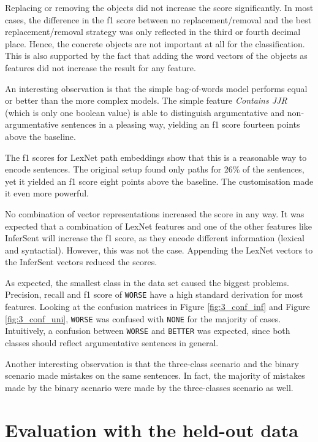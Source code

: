 Replacing or removing the objects did not increase the score significantly. In most cases, the difference in the f1 score between no replacement/removal and the best replacement/removal strategy was only reflected in the third or fourth decimal place. Hence, the concrete objects are not important at all for the classification. This is also supported by the fact that adding the word vectors of the objects as features did not increase the result for any feature.

An interesting observation is that the simple bag-of-words model performs equal or better than the more complex models. The simple feature \emph{Contains JJR} (which is only one boolean value) is able to distinguish argumentative and non-argumentative sentences in a pleasing way, yielding an f1 score fourteen points above the baseline.

The f1 scores for LexNet path embeddings show that this is a reasonable way to encode sentences. The original setup found only paths for 26\% of the sentences, yet it yielded an f1 score eight points above the baseline. The customisation made it even more powerful.

No combination of vector representations increased the score in any way. It was expected that a combination of LexNet features and one of the other features like InferSent will increase the f1 score, as they encode different information (lexical and syntactial). However, this was not the case. Appending the LexNet vectors to the InferSent vectors reduced the scores.

As expected, the smallest class in the data set caused the biggest problems. Precision, recall and f1 score of \texttt{WORSE} have a high standard derivation for most features. Looking at the confusion matrices in Figure \ref{fig:3_conf_inf} and Figure \ref{fig:3_conf_uni}, \texttt{WORSE} was confused with \texttt{NONE} for the majority of cases. Intuitively, a confusion between \texttt{WORSE} and \texttt{BETTER} was expected, since both classes should reflect argumentative sentences in general.

Another interesting observation is that the three-class scenario and the binary scenario made mistakes on the same sentences. In fact, the majority of mistakes made by the binary scenario were made by the three-classes scenario as well.


\section{Evaluation with the held-out data}
